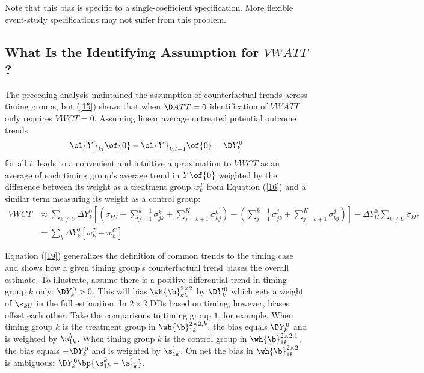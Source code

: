 \documentclass[12pt]{article}
\newcommand{\highlightP}[1]{{\emph{\color{MyPink}{#1}}}}
\theoremstyle{definition}
\begin{document}
Note that this bias is specific to a single-coefficient specification. More flexible event-study specifications may not suffer from this problem. 

\subsection{What Is the Identifying Assumption for $VWATT$?}

The preceding analysis maintained the assumption of \highlightP{equal} counterfactual trends across timing groups, but (\ref{15}) shows that when $\D ATT = 0$ identification of $VWATT$ only requires $VWCT = 0$. Assuming linear average untreated potential outcome trends 
$$
\ol{Y}_{kt}\of{0} - \ol{Y}_{k, t-1}\of{0} = \D Y_k^0
$$
for all $t$, leads to a convenient and intuitive approximation to $VWCT$ as an average of each timing group's average trend in $Y\of{0}$ weighted by the difference between its weight as a treatment group $w_k^T$ from Equation (\ref{16}) and a similar term measuring its weight as a control group:
\begin{equation}
    \label{19}
    \begin{aligned}
    V W C T & \approx \sum_{k \neq U} \Delta Y_k^0\left[\left(\sigma_{k U}+\sum_{j=1}^{k-1} \sigma_{j k}^k+\sum_{j=k+1}^K \sigma_{k j}^k\right)-\left(\sum_{j=1}^{k-1} \sigma_{j k}^j+\sum_{j=k+1}^K \sigma_{k j}^j\right)\right]-\Delta Y_U^0 \sum_{k \neq U} \sigma_{k U} \\
    & =\sum_k \Delta Y_k^0\left[w_k^T-w_k^C\right]
    \end{aligned}
\end{equation}

Equation (\ref{19}) generalizes the definition of common trends to the timing case and shows how a given timing group's counterfactual trend biases the overall estimate. To illustrate, assume there is a positive differential trend in timing group $k$ only: $\D Y_k^0 > 0$. This will bias $\wh{\b}_{kU}^{2\times2}$ by $\D Y_k^0$ which gets a weight of $\s_{kU}$ in the full estimation. In $2\times2$ DDs based on timing, however, biases offset each other. Take the comparisons to timing group $1$, for example. When timing group $k$ is the  treatment group in $\wh{\b}_{1k}^{2\times2, k}$, the bias equals $\D Y_k^0$ and is weighted by $\s_{1k}^{k}$. When timing group $k$ is the control group in $\wh{\b}_{1k}^{2\times2, 1}$,  the bias equals $-\D Y_k^0$ and is weighted by $\s_{1k}^{1}$. On net the bias in $\wh{\b}_{1k}^{2\times2}$ is ambiguous: $\D Y_k^0 \bp{\s_{1k}^{k} - \s_{1k}^{1}}$.
\end{document}
